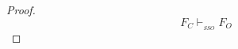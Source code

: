 \documentclass[conference]{IEEEtran}
\begin{document}
\begin{proof}
	 \begin{equation}\label{SSOEND}
          F_C \vdash_{_{SSO}} F_O
         \end{equation}



\end{proof}
\end{document}
